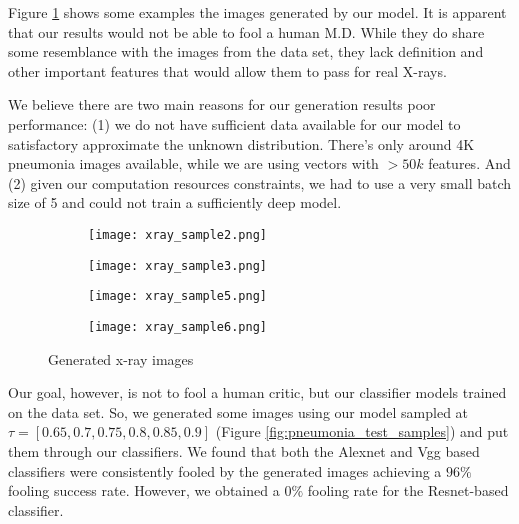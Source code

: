 Figure \ref{fig:xray_results} shows some examples the images generated by our model. It is apparent that our results would not be able to fool a human M.D. While they do share some resemblance with the images from the data set, they lack definition and other important features that would allow them to pass for real X-rays.

We believe there are two main reasons for our generation results poor performance: (1) we do not have sufficient data available for our model to satisfactory approximate the unknown distribution. There's only around 4K pneumonia images available, while we are using vectors with $> 50k$ features. And (2) given our computation resources constraints, we had to use a very small batch size of 5 and could not train a sufficiently deep model.

\begin{figure}[htbp!]
     \centering
     \begin{subfigure}[b]{0.3\textwidth}
         \centering
         \texttt{[image: xray\_sample2.png]}
     \end{subfigure}
     \hfill
     \begin{subfigure}[b]{0.3\textwidth}
         \centering
         \texttt{[image: xray\_sample3.png]}
     \end{subfigure}
     \hfill
     \begin{subfigure}[b]{0.3\textwidth}
         \centering
         \texttt{[image: xray\_sample5.png]}
     \end{subfigure}
     \hfill
     \begin{subfigure}[b]{0.3\textwidth}
         \centering
         \texttt{[image: xray\_sample6.png]}
     \end{subfigure}
     \caption{Generated x-ray images}
     \label{fig:xray_results}
\end{figure}

Our goal, however, is not to fool a human critic, but our classifier models trained on the data set. So, we generated some images using our model sampled at $\tau = [0.65, 0.7, 0.75, 0.8, 0.85, 0.9]$ (Figure \ref{fig:pneumonia_test_samples}) and put them through our classifiers. We found that both the Alexnet and Vgg based classifiers were consistently fooled by the generated images achieving a $96\%$ fooling success rate. However, we obtained a $0\%$ fooling rate for the Resnet-based classifier. 

